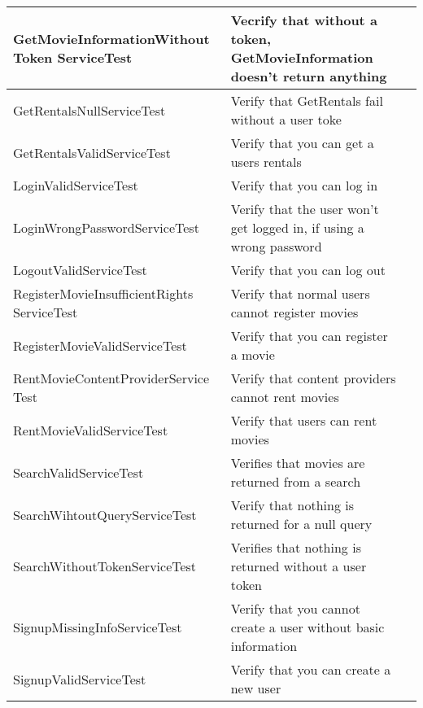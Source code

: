 \begin{centering}
\begin{longtable}{| p{5 cm} | p{9 cm} | c |}
\hline
GetMovieInformationWithout Token ServiceTest & Vecrify that without a token, GetMovieInformation doesn't return anything & \\
\hline
GetRentalsNullServiceTest & Verify that GetRentals fail without a user toke & \\
\hline
GetRentalsValidServiceTest & Verify that you can get a users rentals & \\
\hline
LoginValidServiceTest & Verify that you can log in & \\
\hline
LoginWrongPasswordServiceTest & Verify that the user won't get logged in, if using a wrong password & \\
\hline
LogoutValidServiceTest & Verify that you can log out & \\
\hline
RegisterMovieInsufficientRights ServiceTest & Verify that normal users cannot register movies & \\
\hline
RegisterMovieValidServiceTest & Verify that you can register a movie & \\
\hline
RentMovieContentProviderService Test & Verify that content providers cannot rent movies & \\
\hline
RentMovieValidServiceTest & Verify that users can rent movies & \\
\hline
SearchValidServiceTest & Verifies that movies are returned from a search & \\
\hline
SearchWihtoutQueryServiceTest & Verify that nothing is returned for a null query & \\
\hline
SearchWithoutTokenServiceTest & Verifies that nothing is returned without a user token & \\
\hline
SignupMissingInfoServiceTest & Verify that you cannot create a user without basic information & \\
\hline
SignupValidServiceTest & Verify that you can create a new user & \\
\hline
\end{longtable}
\end{centering}
